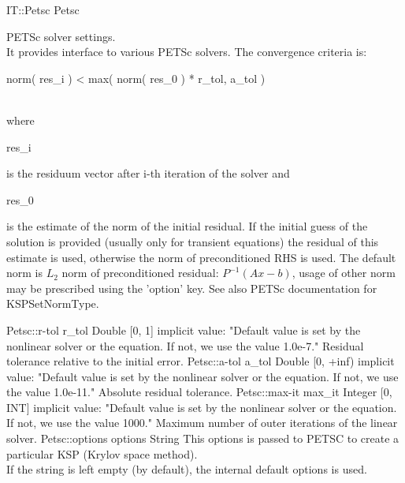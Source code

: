 \begin{RecordType}
	{IT::Petsc}
	{Petsc}
	{}%
	{}%
	{{{PETSc solver settings.}\\{
 It provides interface to various PETSc solvers.
The convergence criteria is:}\\
\begin{ttfamily}norm( res{\_}i )  {\textless} max( norm( res{\_}0 ) * r{\_}tol, a{\_}tol )\end{ttfamily}\\{
where }\begin{ttfamily}res{\_}i\end{ttfamily}{ is the residuum vector after i-th iteration of the solver and }\begin{ttfamily}res{\_}0\end{ttfamily}{ is the estimate of the norm of the initial residual.
If the initial guess of the solution is provided (usually only for transient equations) the residual of this estimate is used, otherwise the norm of preconditioned RHS is used.
The default norm is }{$L_2$}{ norm of preconditioned residual: }{$ P^{-1}(Ax-b)$}{, usage of other norm may be prescribed using the 'option' key.
See also PETSc documentation for KSPSetNormType.}%
}}
		\RecKey
			{Petsc::r-tol}
			{r{\_}tol}
			{{Double [0, 1]}}{}
			{implicit value: "{Default value is set by the nonlinear solver or the equation. If not, we use the value 1.0e-7.}"}
			{{{Residual tolerance relative to the initial error.}%
}}
		\RecKey
			{Petsc::a-tol}
			{a{\_}tol}
			{{Double [0, +inf)}}{}
			{implicit value: "{Default value is set by the nonlinear solver or the equation. If not, we use the value 1.0e-11.}"}
			{{{Absolute residual tolerance.}%
}}
		\RecKey
			{Petsc::max-it}
			{max{\_}it}
			{{Integer [0, INT]}}{}
			{implicit value: "{Default value is set by the nonlinear solver or the equation. If not, we use the value 1000.}"}
			{{{Maximum number of outer iterations of the linear solver.}%
}}
		\RecKey
			{Petsc::options}
			{options}
			{{String}}{}
			{ }
			{{{This options is passed to PETSC to create a particular KSP (Krylov space method).}\\{
If the string is left empty (by default), the internal default options is used.}%
}}
\end{RecordType}
